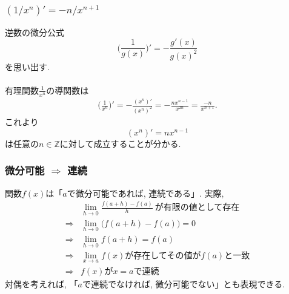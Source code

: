 \documentclass[dvipdfmx,cjk,10.2pt]{beamer}
\newcommand{\Z}{\mathbb{Z}}
\theoremstyle{definition}
\begin{document}
\begin{frame}
\frametitle{$(1/x^n)'=-n/x^{n+1}$}

逆数の微分公式
$$
\Big(\frac{1}{g(x)}\Big)'=-\frac{g'(x)}{g(x)^2}
$$
を思い出す. \\
\ \\

有理関数$\frac{1}{x^n}$の導関数は
\begin{align*}
\Big(\frac{1}{x^n}\Big)' = -\frac{(x^n)'}{(x^n)^2}=-\frac{nx^{n-1}}{x^{2n}}=\frac{-n}{x^{n+1}}. 
\end{align*}
これより
$$
(x^n)'=nx^{n-1}
$$
は任意の$n \in \Z$に対して成立することが分かる. 

\end{frame}





\begin{frame}
\frametitle{微分可能 $\Rightarrow$ 連続}

関数$f(x)$は「$a$で微分可能であれば, 連続である」. 
実際, 
\begin{align*}
& \lim_{h\to 0} \frac{f(a+h)-f(a)}{h} \  \text{が有限の値として存在}\\ 
\Longrightarrow & \lim_{h\to 0} \big(f(a+h)-f(a)\big)=0 \\
\Longrightarrow &  \lim_{h\to 0} f(a+h)= f(a) \\
\Longrightarrow & \text{$\lim_{ x \to a} f(x)$が存在してその値が$f(a)$と一致} \\
\Longrightarrow & \text{$f(x)$が$x=a$で連続}
\end{align*}
対偶を考えれば, 「$a$で連続でなければ, 微分可能でない」とも表現できる.  


\end{frame}


\end{document}

